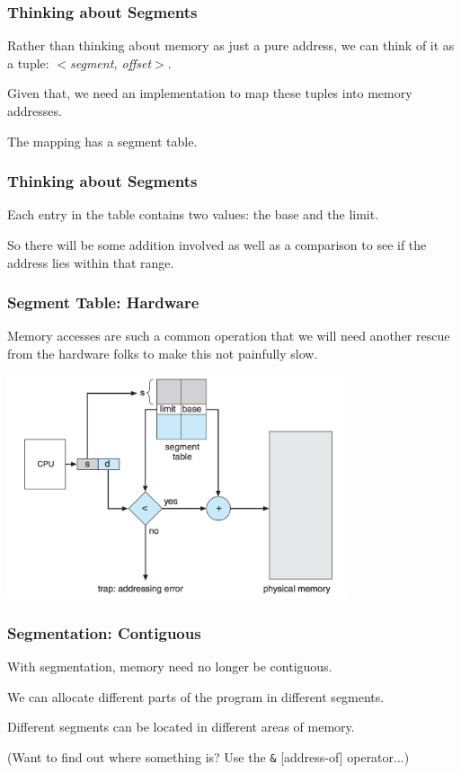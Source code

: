 \begin{frame}
\frametitle{Thinking about Segments}

Rather than thinking about memory as just a pure address, we can think of it as a tuple: \textit{$<$segment, offset$>$}. 

Given that, we need an implementation to map these tuples into memory addresses. 

The mapping has a segment table.

\end{frame}

\begin{frame}
\frametitle{Thinking about Segments}

Each entry in the table contains two values: the base and the limit.

So there will be some addition involved as well as a comparison to see if the address lies within that range.

\end{frame}

\begin{frame}
\frametitle{Segment Table: Hardware}

Memory accesses are such a common operation that we will need another rescue from the hardware folks to make this not painfully slow.

\begin{center}
\includegraphics[width=0.75\textwidth]{images/segmentation-hardware.png}
\end{center}

\end{frame}

\begin{frame}
\frametitle{Segmentation: Contiguous}

With segmentation, memory need no longer be contiguous. 

We can allocate different parts of the program in different segments. 

Different segments can be located in different areas of memory.

(Want to find out where something is? Use the \texttt{\&} [address-of] operator...)


\end{frame}

